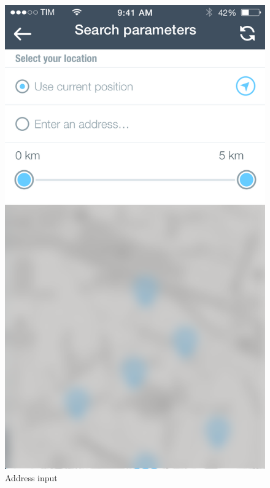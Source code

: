 \documentclass[12pt]{article}
\begin{document}
		\begin{figure}
		 \centering	
		 \includegraphics[scale=0.25]{Images/Param.png}
		 \caption{Address input}
		 \endminipage
		 \centering

\end{figure}
\end{document}
